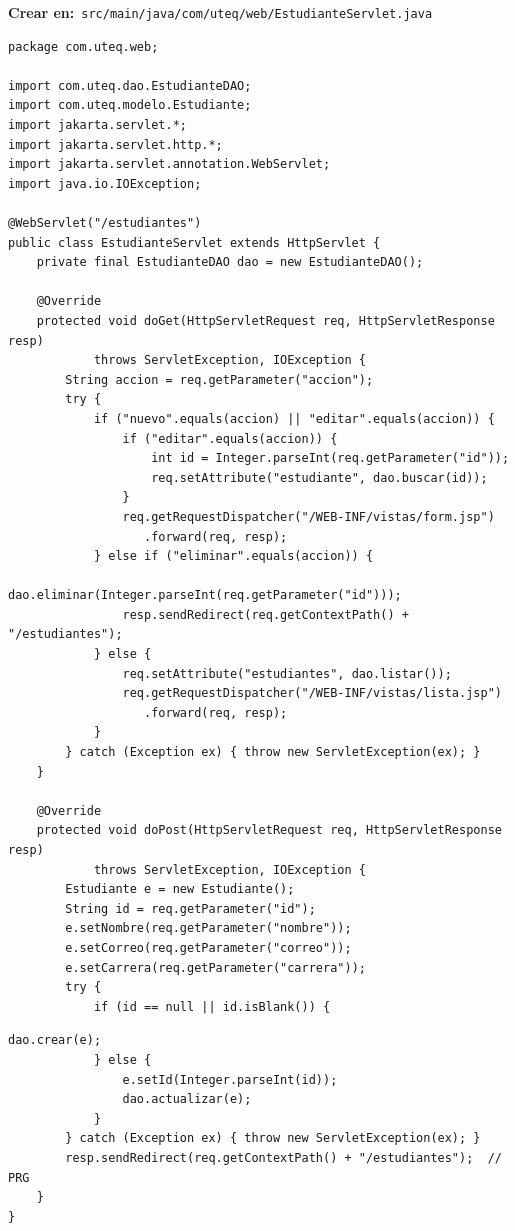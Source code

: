 \documentclass[11pt]{article}
\begin{document}
{\small\color{jwebazulo}\textbf{Crear en:}~}\texttt{src/\allowbreak{}main/\allowbreak{}java/\allowbreak{}com/\allowbreak{}uteq/\allowbreak{}web/\allowbreak{}Estudiante\allowbreak{}Servlet.\allowbreak{}java}\par\nobreak\vspace{-1pt}
\begin{cajacodigo}
\begin{lstlisting}[style=java]
package com.uteq.web;

import com.uteq.dao.EstudianteDAO;
import com.uteq.modelo.Estudiante;
import jakarta.servlet.*;
import jakarta.servlet.http.*;
import jakarta.servlet.annotation.WebServlet;
import java.io.IOException;

@WebServlet("/estudiantes")
public class EstudianteServlet extends HttpServlet {
    private final EstudianteDAO dao = new EstudianteDAO();

    @Override
    protected void doGet(HttpServletRequest req, HttpServletResponse resp)
            throws ServletException, IOException {
        String accion = req.getParameter("accion");
        try {
            if ("nuevo".equals(accion) || "editar".equals(accion)) {
                if ("editar".equals(accion)) {
                    int id = Integer.parseInt(req.getParameter("id"));
                    req.setAttribute("estudiante", dao.buscar(id));
                }
                req.getRequestDispatcher("/WEB-INF/vistas/form.jsp")
                   .forward(req, resp);
            } else if ("eliminar".equals(accion)) {
                dao.eliminar(Integer.parseInt(req.getParameter("id")));
                resp.sendRedirect(req.getContextPath() + "/estudiantes");
            } else {
                req.setAttribute("estudiantes", dao.listar());
                req.getRequestDispatcher("/WEB-INF/vistas/lista.jsp")
                   .forward(req, resp);
            }
        } catch (Exception ex) { throw new ServletException(ex); }
    }

    @Override
    protected void doPost(HttpServletRequest req, HttpServletResponse resp)
            throws ServletException, IOException {
        Estudiante e = new Estudiante();
        String id = req.getParameter("id");
        e.setNombre(req.getParameter("nombre"));
        e.setCorreo(req.getParameter("correo"));
        e.setCarrera(req.getParameter("carrera"));
        try {
            if (id == null || id.isBlank()) {
\end{lstlisting}
\end{cajacodigo}
\vspace{2pt}
\begin{cajacodigo}
\begin{lstlisting}[style=java]
                dao.crear(e);
            } else {
                e.setId(Integer.parseInt(id));
                dao.actualizar(e);
            }
        } catch (Exception ex) { throw new ServletException(ex); }
        resp.sendRedirect(req.getContextPath() + "/estudiantes");  // PRG
    }
}
\end{lstlisting}
\end{cajacodigo}
\vspace{2pt}
\end{document}
